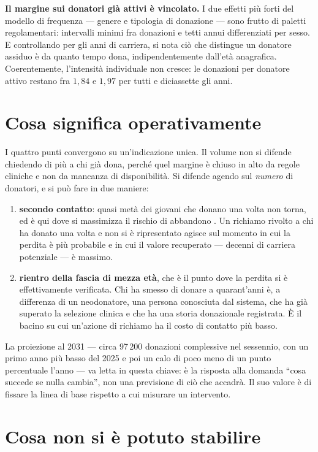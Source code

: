 \textbf{Il margine sui donatori già attivi è vincolato.} I due effetti più
forti del modello di frequenza --- genere e tipologia di donazione --- sono
frutto di paletti regolamentari: intervalli minimi fra donazioni e
tetti annui differenziati per sesso. E controllando per gli anni di carriera, si
nota ciò che distingue un donatore assiduo è da
quanto tempo dona, indipendentemente dall'età anagrafica. 
Coerentemente, l'intensità individuale non cresce: le
donazioni per donatore attivo restano fra $1{,}84$ e $1{,}97$ per tutti e
diciassette gli anni.

\section*{Cosa significa operativamente}

I quattro punti convergono su un'indicazione unica. Il volume non si difende
chiedendo di più a chi già dona, perché quel margine è chiuso in alto da regole
cliniche e non da mancanza di disponibilità. Si difende agendo sul \emph{numero} di
donatori, e si può fare in due maniere:

\begin{enumerate}
    \item \textbf{secondo contatto}: quasi metà dei giovani che donano una
volta non torna, ed è qui dove si massimizza il rischio di abbandono . Un
richiamo rivolto a chi ha donato una volta e non si è ripresentato agisce sul
momento in cui la perdita è più probabile e in cui il valore recuperato ---
decenni di carriera potenziale --- è massimo.
    \item \textbf{rientro della fascia di mezza età}, che è il punto dove
la perdita si è effettivamente verificata. Chi ha smesso di donare a quarant'anni è,
a differenza di un neodonatore, una persona conosciuta dal sistema, 
che ha già superato la selezione clinica e che ha una storia donazionale registrata.
È il bacino su cui un'azione di richiamo ha il costo di contatto più basso.
\end{enumerate}

La proiezione al 2031 --- circa 97\,200 donazioni complessive nel sessennio,
con un primo anno più basso del 2025 e poi un calo di poco meno di un punto
percentuale l'anno --- va letta in questa
chiave: è la risposta alla domanda ``cosa succede se nulla cambia'', non una
previsione di ciò che accadrà. Il suo valore è di fissare la linea di base
rispetto a cui misurare un intervento.

\section*{Cosa non si è potuto stabilire}

